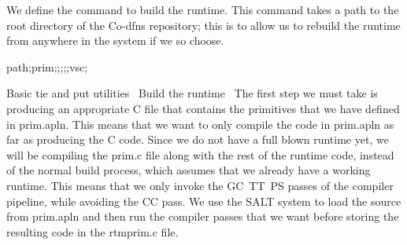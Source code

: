 \documentclass{article}%
\begin{document}
We define the command {\Tt{}\nwendquote} to build the runtime.
This command takes a path to the root directory of the Co-dfns
repository; this is to allow us to rebuild the runtime from anywhere
in the system if we so choose.

\nwenddocs{}\endmoddef\nwstartdeflinemarkup\nwenddeflinemarkup
{} path;prim;;;;;vsc;

\LA{}Basic \code{}tie\edoc{} and \code{}put\edoc{} utilities~{\nwtagstyle{}}\RA{}
\LA{}Build the runtime~{\nwtagstyle{}}\RA{} 
\eatline
{}\nwendcode{}\nwdocspar
The first step we must take is producing an appropriate C file that 
contains the primitives that we have defined in {\Tt{}prim.apln\nwendquote}.
This means that we want to only compile the code in {\Tt{}prim.apln\nwendquote} 
as far as producing the C code. 
Since we do not have a full blown runtime yet,
we will be compiling the {\Tt{}prim.c\nwendquote} file along with the rest of the 
runtime code, 
instead of the normal build process,
which assumes that we already have a working runtime.
This means that we only invoke the {\Tt{}GC\ TT\ PS\nwendquote} passes of the 
compiler pipeline, while avoiding the {\Tt{}CC\nwendquote} pass.
We use the SALT system to load the source from {\Tt{}prim.apln\nwendquote} and then 
run the compiler passes that we want before storing the resulting 
code in the {\Tt{}rtm{\nwbackslash}prim.c\nwendquote} file.
\end{document}
